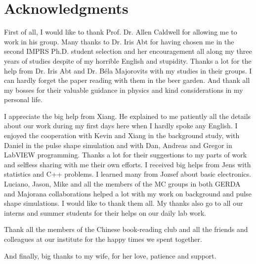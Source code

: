 \chapter{Acknowledgments}
\label{cha:ack}

First of all, I would like to thank Prof. Dr. Allen Caldwell for allowing me to work in his group. Many thanks to Dr. Iris Abt for having chosen me in the second IMPRS Ph.D. student selection and her encouragement all along my three years of studies despite of my horrible English and stupidity. Thanks a lot for the help from Dr. Iris Abt and Dr. B\'ela Majorovits with my studies in their groups. I can hardly forget the paper reading with them in the beer garden.  And thank all my bosses for their valuable guidance in physics and kind considerations in my personal life.

I appreciate the big help from Xiang. He explained to me patiently all the details about our work during my first days here when I hardly spoke any English. I enjoyed the cooperation with Kevin and Xiang in the background study, with Daniel in the pulse shape simulation and with Dan, Andreas and Gregor in LabVIEW programming. Thanks a lot for their suggestions to my parts of work and selfless sharing with me their own efforts. I received big helps from Jens with statistics and C++ problems. I learned many from Jozsef about basic electronics. Luciano, Jason, Mike and all the members of the MC groups in both GERDA and Majorana collaborations helped a lot with my work on background and pulse shape simulations. I would like to thank them all. My thanks also go to all our interns and summer students for their helps on our daily lab work.

Thank all the members of the Chinese book-reading club and all the friends and colleagues at our institute for the happy times we spent together.

And finally, big thanks to my wife, for her love, patience and support.


